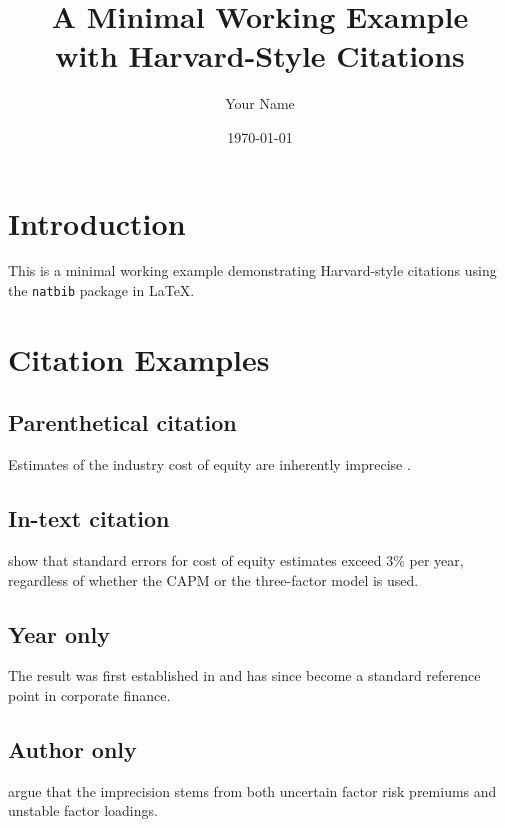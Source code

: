 \documentclass[12pt, a4paper]{article}
\title{A Minimal Working Example\\with Harvard-Style Citations}
\author{Your Name}
\date{\today}
\begin{document}
\maketitle

\section{Introduction}

This is a minimal working example demonstrating Harvard-style citations
using the \texttt{natbib} package in \LaTeX.

\section{Citation Examples}

\subsection{Parenthetical citation}
Estimates of the industry cost of equity are inherently imprecise
\citep{fama1997industry}.

\subsection{In-text citation}
\citet{fama1997industry} show that standard errors for cost of equity
estimates exceed 3\% per year, regardless of whether the CAPM or the
three-factor model is used.

\subsection{Year only}
The result was first established in \citeyear{fama1997industry} and has
since become a standard reference point in corporate finance.

\subsection{Author only}
\citeauthor{fama1997industry} argue that the imprecision stems from
both uncertain factor risk premiums and unstable factor loadings.

\nocite{*}                         %
\end{document}
